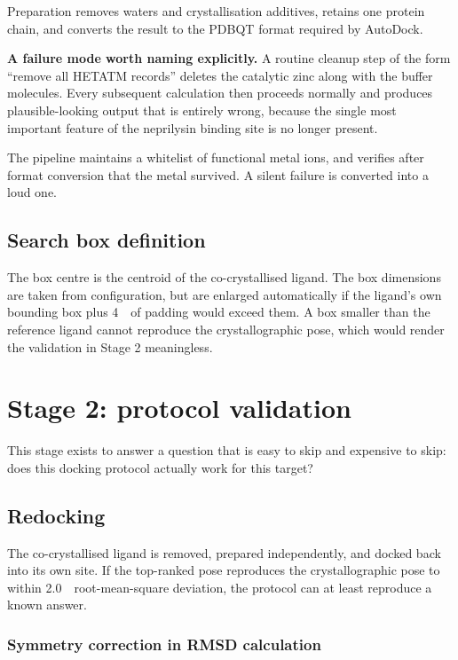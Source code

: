 \documentclass[11pt,a4paper]{article}
\newcommand{\ang}{\text{\AA}}
\begin{document}
Preparation removes waters and crystallisation additives, retains one protein
chain, and converts the result to the PDBQT format required by AutoDock.

\begin{warnbox}
\textbf{A failure mode worth naming explicitly.} A routine cleanup step of the
form ``remove all HETATM records'' deletes the catalytic zinc along with the
buffer molecules. Every subsequent calculation then proceeds normally and
produces plausible-looking output that is entirely wrong, because the single
most important feature of the neprilysin binding site is no longer present.

The pipeline maintains a whitelist of functional metal ions, and verifies after
format conversion that the metal survived. A silent failure is converted into a
loud one.
\end{warnbox}

\subsection{Search box definition}

The box centre is the centroid of the co-crystallised ligand. The box
dimensions are taken from configuration, but are enlarged automatically if the
ligand's own bounding box plus 4~\ang\ of padding would exceed them. A box
smaller than the reference ligand cannot reproduce the crystallographic pose,
which would render the validation in Stage 2 meaningless.

\section{Stage 2: protocol validation}

This stage exists to answer a question that is easy to skip and expensive to
skip: does this docking protocol actually work for this target?

\subsection{Redocking}

The co-crystallised ligand is removed, prepared independently, and docked back
into its own site. If the top-ranked pose reproduces the crystallographic pose
to within 2.0~\ang\ root-mean-square deviation, the protocol can at least
reproduce a known answer.

\subsubsection{Symmetry correction in RMSD calculation}
\end{document}

